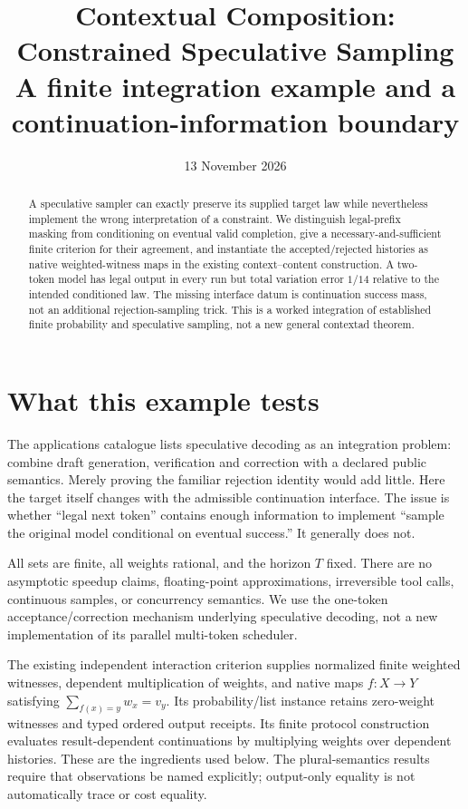 \documentclass[11pt]{article}
\title{Contextual Composition: Constrained Speculative Sampling\\\large A finite integration example and a continuation-information boundary}
\author{}\date{13 November 2026}
\begin{document}
\maketitle
\begin{abstract}
A speculative sampler can exactly preserve its supplied target law while
nevertheless implement the wrong interpretation of a constraint. We distinguish
legal-prefix masking from conditioning on eventual valid completion, give a
necessary-and-sufficient finite criterion for their agreement, and instantiate
the accepted/rejected histories as native weighted-witness maps in the existing
context--content construction. A two-token model has legal output in every run
but total variation error $1/14$ relative to the intended conditioned law.
The missing interface datum is continuation success mass, not an additional
rejection-sampling trick. This is a worked integration of established finite
probability and speculative sampling, not a new general contextad theorem.
\end{abstract}

\section{What this example tests}
The applications catalogue lists speculative decoding as an integration problem:
combine draft generation, verification and correction with a declared public
semantics. Merely proving the familiar rejection identity would add little.
Here the target itself changes with the admissible continuation interface.
The issue is whether ``legal next token'' contains enough information to
implement ``sample the original model conditional on eventual success.''
It generally does not.

All sets are finite, all weights rational, and the horizon $T$ fixed. There are
no asymptotic speedup claims, floating-point approximations, irreversible tool
calls, continuous samples, or concurrency semantics. We use the one-token
acceptance/correction mechanism underlying speculative decoding, not a new
implementation of its parallel multi-token scheduler.

The existing independent interaction criterion supplies normalized finite
weighted witnesses, dependent multiplication of weights, and native maps
$f:X\to Y$ satisfying $\sum_{f(x)=y}w_x=v_y$. Its probability/list instance
retains zero-weight witnesses and typed ordered output receipts. Its finite
protocol construction evaluates result-dependent continuations by multiplying
weights over dependent histories. These are the ingredients used below.
The plural-semantics results require that observations be named explicitly;
output-only equality is not automatically trace or cost equality.
\end{document}
